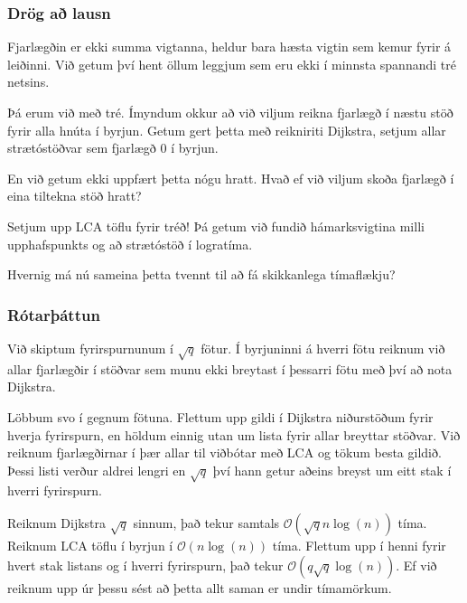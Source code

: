 {
    \frametitle{Drög að lausn}
    {
        \item<1-> Fjarlægðin er ekki summa vigtanna, heldur bara hæsta vigtin sem kemur fyrir á leiðinni. Við getum því hent öllum leggjum
            sem eru ekki í minnsta spannandi tré netsins. 
        \item<2-> Þá erum við með tré. Ímyndum okkur að við viljum reikna fjarlægð í næstu stöð fyrir alla hnúta í byrjun. Getum gert þetta
            með reikniriti Dijkstra, setjum allar strætóstöðvar sem fjarlægð $0$ í byrjun.
        \item<3-> En við getum ekki uppfært þetta nógu hratt. Hvað ef við viljum skoða fjarlægð í eina tiltekna stöð hratt?
        \item<4-> Setjum upp LCA töflu fyrir tréð! Þá getum við fundið hámarksvigtina milli upphafspunkts og að strætóstöð í logratíma.
        \item<5-> Hvernig má nú sameina þetta tvennt til að fá skikkanlega tímaflækju?
    }
}

{
    \frametitle{Rótarþáttun}
    {
        \item<1-> Við skiptum fyrirspurnunum í $\sqrt{q}$ fötur. Í byrjuninni á hverri fötu reiknum við allar fjarlægðir í stöðvar sem munu
            ekki breytast í þessarri fötu með því að nota Dijkstra.
        \item<2-> Löbbum svo í gegnum fötuna. Flettum upp gildi í Dijkstra niðurstöðum fyrir hverja fyrirspurn, en höldum einnig utan um
            lista fyrir allar breyttar stöðvar. Við reiknum fjarlægðirnar í þær allar til viðbótar með LCA og tökum besta gildið. Þessi
            listi verður aldrei lengri en $\sqrt{q}$ því hann getur aðeins breyst um eitt stak í hverri fyrirspurn.
        \item<3-> Reiknum Dijkstra $\sqrt{q}$ sinnum, það tekur samtals $\mathcal{O}(\sqrt{q}n\log(n))$ tíma. Reiknum LCA töflu í byrjun
            í $\mathcal{O}(n\log(n))$ tíma. Flettum upp í henni fyrir hvert stak listans og í hverri fyrirspurn, það tekur 
            $\mathcal{O}(q\sqrt{q}\log(n))$. Ef við reiknum upp úr þessu sést að þetta allt saman er undir tímamörkum.
    }
}

{
}


